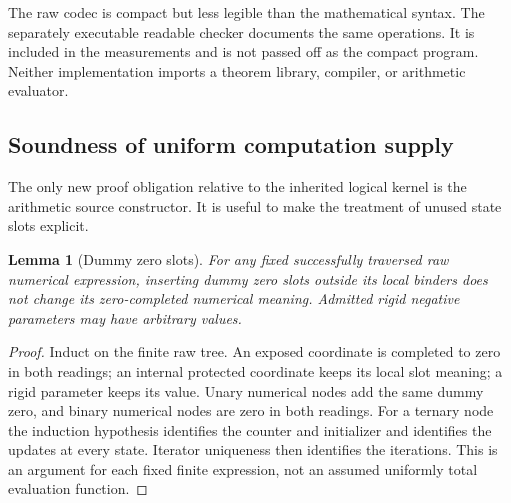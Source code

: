 \documentclass[11pt,letterpaper]{article}
\newtheorem{lemma}[theorem]{Lemma}
\theoremstyle{definition}\newtheorem{definition}[theorem]{Definition}
\theoremstyle{remark}\newtheorem{remark}[theorem]{Remark}
\begin{document}
The raw codec is compact but less legible than the mathematical syntax.
The separately executable readable checker documents the same operations.
It is included in the measurements and is not passed off as the compact
program. Neither implementation imports a theorem library, compiler, or
arithmetic evaluator.

\subsection{Soundness of uniform computation supply}

The only new proof obligation relative to the inherited logical kernel is
the arithmetic source constructor. It is useful to make the treatment of
unused state slots explicit.

\begin{lemma}[Dummy zero slots]
For any fixed successfully traversed raw numerical expression, inserting
dummy zero slots outside its local binders does not change its
zero-completed numerical meaning. Admitted rigid negative parameters may
have arbitrary values.
\end{lemma}
\begin{proof}
Induct on the finite raw tree. An exposed coordinate is completed to zero
in both readings; an internal protected coordinate keeps its local slot
meaning; a rigid parameter keeps its value. Unary numerical nodes add the
same dummy zero, and binary numerical nodes are zero in both readings.
For a ternary node the induction hypothesis identifies the counter and
initializer and identifies the updates at every state. Iterator uniqueness
then identifies the iterations. This is an argument for each fixed finite
expression, not an assumed uniformly total evaluation function.
\end{proof}
\end{document}

